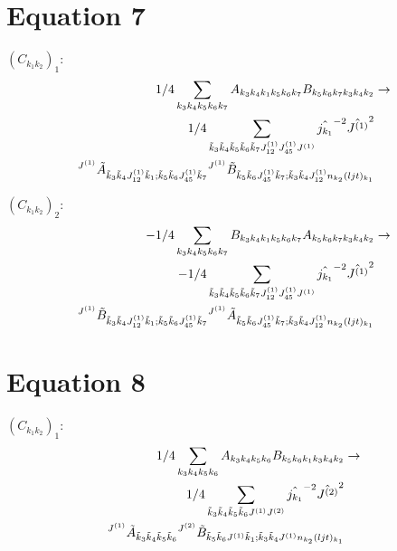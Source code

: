 \documentclass[11pt]{article}
\begin{document}
\section{Equation 7}
$\left({C}_{{k}_{1}{k}_{2}}\right)_{1}$:
\begin{align}
1/4\sum_{{k}_{3}{k}_{4}{k}_{5}{k}_{6}{k}_{7}}{A}_{{k}_{3}{k}_{4}{k}_{1}{k}_{5}{k}_{6}{k}_{7}}{B}_{{k}_{5}{k}_{6}{k}_{7}{k}_{3}{k}_{4}{k}_{2}}&\rightarrow \notag \\1/4\sum_{\tilde{k}_{3}\tilde{k}_{4}\tilde{k}_{5}\tilde{k}_{6}\tilde{k}_{7}J^{(1)}_{12}J^{(1)}_{45}J^{(1)}}\hat{j_{{k}_{1}}}^{-2}\hat{J^{(1)}}^{2}& \notag \\{}^{J^{(1)}}\tilde{A}_{\tilde{k}_{3}\tilde{k}_{4}J^{(1)}_{12}\tilde{k}_{1};\tilde{k}_{5}\tilde{k}_{6}J^{(1)}_{45}\tilde{k}_{7}}{}^{J^{(1)}}\tilde{B}_{\tilde{k}_{5}\tilde{k}_{6}J^{(1)}_{45}\tilde{k}_{7};\tilde{k}_{3}\tilde{k}_{4}J^{(1)}_{12}n_{{k}_{2}}(ljt)_{{k}_{1}}}& \notag \\
\end{align}

$\left({C}_{{k}_{1}{k}_{2}}\right)_{2}$:
\begin{align}
-1/4\sum_{{k}_{3}{k}_{4}{k}_{5}{k}_{6}{k}_{7}}{B}_{{k}_{3}{k}_{4}{k}_{1}{k}_{5}{k}_{6}{k}_{7}}{A}_{{k}_{5}{k}_{6}{k}_{7}{k}_{3}{k}_{4}{k}_{2}}&\rightarrow \notag \\-1/4\sum_{\tilde{k}_{3}\tilde{k}_{4}\tilde{k}_{5}\tilde{k}_{6}\tilde{k}_{7}J^{(1)}_{12}J^{(1)}_{45}J^{(1)}}\hat{j_{{k}_{1}}}^{-2}\hat{J^{(1)}}^{2}& \notag \\{}^{J^{(1)}}\tilde{B}_{\tilde{k}_{3}\tilde{k}_{4}J^{(1)}_{12}\tilde{k}_{1};\tilde{k}_{5}\tilde{k}_{6}J^{(1)}_{45}\tilde{k}_{7}}{}^{J^{(1)}}\tilde{A}_{\tilde{k}_{5}\tilde{k}_{6}J^{(1)}_{45}\tilde{k}_{7};\tilde{k}_{3}\tilde{k}_{4}J^{(1)}_{12}n_{{k}_{2}}(ljt)_{{k}_{1}}}& \notag \\
\end{align}

\section{Equation 8}
$\left({C}_{{k}_{1}{k}_{2}}\right)_{1}$:
\begin{align}
1/4\sum_{{k}_{3}{k}_{4}{k}_{5}{k}_{6}}{A}_{{k}_{3}{k}_{4}{k}_{5}{k}_{6}}{B}_{{k}_{5}{k}_{6}{k}_{1}{k}_{3}{k}_{4}{k}_{2}}&\rightarrow \notag \\1/4\sum_{\tilde{k}_{3}\tilde{k}_{4}\tilde{k}_{5}\tilde{k}_{6}J^{(1)}J^{(2)}}\hat{j_{{k}_{1}}}^{-2}\hat{J^{(2)}}^{2}& \notag \\{}^{J^{(1)}}\tilde{A}_{\tilde{k}_{3}\tilde{k}_{4}\tilde{k}_{5}\tilde{k}_{6}}{}^{J^{(2)}}\tilde{B}_{\tilde{k}_{5}\tilde{k}_{6}J^{(1)}\tilde{k}_{1};\tilde{k}_{3}\tilde{k}_{4}J^{(1)}n_{{k}_{2}}(ljt)_{{k}_{1}}}& \notag \\
\end{align}
\end{document}
